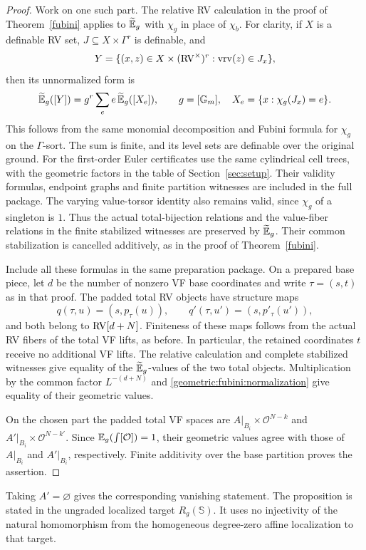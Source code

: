 \begin{proof}
Work on one such part. The relative RV calculation in the proof of
Theorem~\ref{fubini} applies to $\widetilde{\mathbb E}_g$ with $\chi_g$ in place of $\chi_b$.
For clarity, if $X$ is a definable RV set,
$J\subseteq X\times\Gamma^r$ is definable, and
\[
 Y=\{(x,z)\in X\times(\mathrm{RV}^\times)^r:\operatorname{vrv}(z)\in J_x\},
\]
then its unnormalized form is
\begin{equation}\label{geometric:fubini:push}
 \widetilde{\mathbb E}_g([Y])=g^r\sum_e e\,\widetilde{\mathbb E}_g([X_e]),\qquad
 g=[\mathbb G_m],\quad X_e=\{x:\chi_g(J_x)=e\}.
\end{equation}
This follows from the same monomial decomposition and Fubini formula
for $\chi_g$ on the $\Gamma$-sort. The sum is finite, and its level sets are definable over the
original ground. For the first-order Euler certificates use the same cylindrical cell trees,
with the geometric factors in the table of Section~\ref{sec:setup}.
Their validity formulas, endpoint graphs and finite partition witnesses
are included in the full package. The varying value-torsor identity also remains valid,
since $\chi_g$ of a singleton is $1$. Thus the actual total-bijection
relations and the value-fiber relations in the finite stabilized
witnesses are preserved by $\widetilde{\mathbb E}_g$. Their common stabilization is
cancelled additively, as in the proof of Theorem~\ref{fubini}.

Include all these formulas in the same preparation package. On a
prepared base piece, let $d$ be the number of nonzero VF base coordinates
and write $\tau=(s,t)$ as in that proof. The padded total RV objects have
structure maps
\[
 q(\tau,u)=(s,p_\tau(u)),\qquad
 q'(\tau,u')=(s,p'_\tau(u')),
\]
and both belong to $\mathrm{RV}[d+N]$. Finiteness of these maps follows from the
actual RV fibers of the total VF lifts, as before. In particular, the
retained coordinates $t$ receive no additional VF lifts. The relative
calculation and complete stabilized witnesses give equality of the
$\widetilde{\mathbb E}_g$-values of the two total objects. Multiplication by the common
factor $L^{-(d+N)}$ and \eqref{geometric:fubini:normalization} give equality of their
geometric values.

On the chosen part the padded total VF spaces are
$A|_{B_i}\times\mathcal O^{N-k}$ and $A'|_{B_i}\times\mathcal O^{N-k'}$.
Since $\mathbb E_g(\int[\mathcal O])=1$, their geometric values agree with those of
$A|_{B_i}$ and $A'|_{B_i}$, respectively. Finite additivity over the base
partition proves the assertion.
\end{proof}

\begin{rem}
Taking $A'=\varnothing$ gives the corresponding vanishing statement.
The proposition is stated in the ungraded localized target
$R_g(\mathbb S)$. It uses no injectivity of the natural homomorphism
from the homogeneous degree-zero affine localization to that target.
\end{rem}
